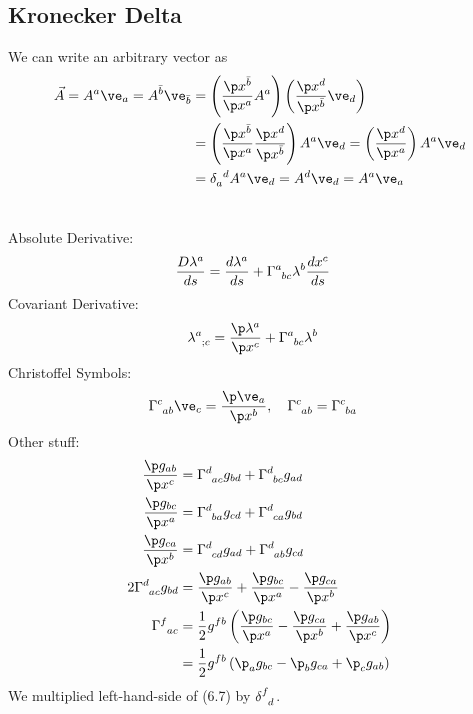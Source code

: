 \documentclass[a4paper, 11pt, normalem]{report}
\begin{document}
\section{Kronecker Delta}
We can write an arbitrary vector as
\begin{align}
    \vec{A} = A^a\ve_a = A^{\bar{b}}\ve_{\bar{b}} &= \left(\frac{\p x^{\bar{b}}}{\p x^a}A^a\right)\left(\frac{\p x^{d}}{\p x^{\bar{b}}}\ve_d\right) \\
                                                  &= \left(\frac{\p x^{\bar{b}}}{\p x^a}\frac{\p x^{d}}{\p x^{\bar{b}}}\right)A^a\ve_d = \left(\frac{\p x^{d}}{\p x^a}\right)A^a\ve_d \\
                                                  &= \tensor{\delta}{_a^d}A^a\ve_d = A^d\ve_d = A^a\ve_a
\end{align}

\chapter{}

\chapter{}

\chapter{}
Absolute Derivative:
\begin{align}
    \frac{D\lambda^a}{ds} &= \frac{d\lambda^a}{ds} + \tensor{\Gamma}{^a_{bc}}\lambda^b\frac{dx^c}{ds}
\end{align}
Covariant Derivative:
\begin{align}
    \tensor{\lambda}{^a_{;c}} &= \frac{\p\lambda^a}{\p x^c}+\tensor{\Gamma}{^a_{bc}}\lambda^b
\end{align}
Christoffel Symbols:
\begin{align}
    \tensor{\Gamma}{^c_{ab}}\ve_c &= \frac{\p\ve_a}{\p x^b},\quad \tensor{\Gamma}{^c_{ab}} = \tensor{\Gamma}{^c_{ba}}
\end{align}
Other stuff:
\begin{align}
    \frac{\p g_{ab}}{\p x^c} &= \tensor{\Gamma}{^d_{ac}}g_{bd} + \tensor{\Gamma}{^d_{bc}}g_{ad}\\
    \frac{\p g_{bc}}{\p x^a} &= \tensor{\Gamma}{^d_{ba}}g_{cd} + \tensor{\Gamma}{^d_{ca}}g_{bd}\\
    \frac{\p g_{ca}}{\p x^b} &= \tensor{\Gamma}{^d_{cd}}g_{ad} + \tensor{\Gamma}{^d_{ab}}g_{cd}\\
    2\tensor{\Gamma}{^d_{ac}}g_{bd} &= \frac{\p g_{ab}}{\p x^c} + \frac{\p g_{bc}}{\p x^a} - \frac{\p g_{ca}}{\p x^b} \\
    \tensor{\Gamma}{^f_{ac}} &= \frac12 g^{fb}\left(\frac{\p g_{bc}}{\p x^a} - \frac{\p g_{ca}}{\p x^b} + \frac{\p g_{ab}}{\p x^c}\right) \\
                             &= \frac12 g^{fb}\left(\p_a g_{bc} - \p_b g_{ca} + \p_c g_{ab}\right)
\end{align}
We multiplied left-hand-side of (6.7) by $\tensor{\delta}{^f_d}$.
\end{document}
